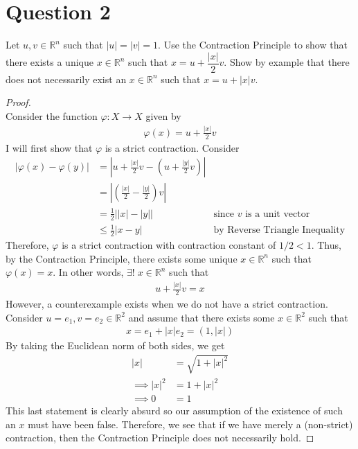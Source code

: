 \documentclass[10pt,a4paper]{article}
\theoremstyle{definition}
\theoremstyle{definition}
\numberwithin{equation}{section}
\begin{document}
\section*{Question 2}
Let $u, v \in \mathbb{R}^n$ such that $|u| = |v| = 1$. Use the Contraction Principle to show that there exists a unique $x \in \mathbb{R}^n$ such that $x = u + \dfrac{|x|}{2}v$. Show by example that there does not necessarily exist an $x \in \mathbb{R}^n$ such that $x = u + |x|v$. 

\begin{proof}$ $
\\Consider the function $\varphi: X \to X$ given by 
\begin{align*}
\varphi(x) = u + \frac{|x|}{2}v
\end{align*}
I will first show that $\varphi$ is a strict contraction. Consider
\begin{align*}
|\varphi(x) - \varphi(y)| &= \left|u + \frac{|x|}{2}v - \left(u + \frac{|y|}{2}v\right)\right|\\
&= \left|\left(\frac{|x|}{2} - \frac{|y|}{2}\right)v\right|\\
&= \frac{1}{2}\big| |x| - |y| \big| &\text{since $v$ is a unit vector}\\
&\leq \frac{1}{2} |x - y| &\text{by Reverse Triangle Inequality}
\end{align*}
Therefore, $\varphi$ is a strict contraction with contraction constant of $1/2 < 1$. Thus, by the Contraction Principle, there exists some unique $x \in \mathbb{R}^n$ such that $\varphi(x) = x$. In other words, $\exists ! \; x \in \mathbb{R}^n$ such that
\begin{align*}
u + \frac{|x|}{2}v = x
\end{align*}
However, a counterexample exists when we do not have a strict contraction. Consider $u = e_1, v = e_2 \in \mathbb{R}^2$ and assume that there exists some $x \in \mathbb{R}^2$ such that
\begin{align*}
x = e_1 + |x|e_2 = (1, |x|)
\end{align*}
By taking the Euclidean norm of both sides, we get
\begin{align*}
|x| &= \sqrt{1 + |x|^2}\\
\implies |x|^2 &= 1 + |x|^2\\
\implies 0 &= 1
\end{align*}
This last statement is clearly absurd so our assumption of the existence of such an $x$ must have been false. Therefore, we see that if we have merely a (non-strict) contraction, then the Contraction Principle does not necessarily hold.
\end{proof}
\end{document}
